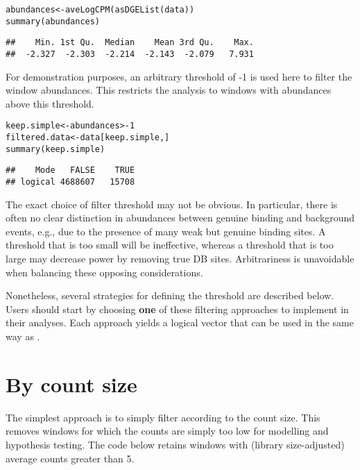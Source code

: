 \documentclass{report}\usepackage[]{graphicx}\usepackage[usenames,dvipsnames]{color}
\newcommand{\hlnum}[1]{\textcolor[rgb]{0.816,0.125,0.439}{#1}}%
\newcommand{\hlopt}[1]{\textcolor[rgb]{0,0,0}{#1}}%
\newcommand{\hlstd}[1]{\textcolor[rgb]{0.251,0.251,0.251}{#1}}%
\newcommand{\hlkwb}[1]{\textcolor[rgb]{0,0,0}{#1}}%
\newcommand{\hlkwd}[1]{\textcolor[rgb]{0.878,0.439,0.125}{#1}}%
\newenvironment{knitrout}{}{} %
\begin{document}
\begin{knitrout}
\color{fgcolor}\begin{kframe}
\begin{alltt}
\hlstd{abundances} \hlkwb{<-} \hlkwd{aveLogCPM}\hlstd{(}\hlkwd{asDGEList}\hlstd{(data))}
\hlkwd{summary}\hlstd{(abundances)}
\end{alltt}
\begin{verbatim}
##    Min. 1st Qu.  Median    Mean 3rd Qu.    Max. 
##  -2.327  -2.303  -2.214  -2.143  -2.079   7.931
\end{verbatim}
\end{kframe}
\end{knitrout}

For demonstration purposes, an arbitrary threshold of -1 is used here to filter the window abundances. 
This restricts the analysis to windows with abundances above this threshold.

\begin{knitrout}
\color{fgcolor}\begin{kframe}
\begin{alltt}
\hlstd{keep.simple} \hlkwb{<-} \hlstd{abundances} \hlopt{> -}\hlnum{1}
\hlstd{filtered.data} \hlkwb{<-} \hlstd{data[keep.simple,]}
\hlkwd{summary}\hlstd{(keep.simple)}
\end{alltt}
\begin{verbatim}
##    Mode   FALSE    TRUE 
## logical 4688607   15708
\end{verbatim}
\end{kframe}
\end{knitrout}

The exact choice of filter threshold may not be obvious.
In particular, there is often no clear distinction in abundances between genuine binding and background events, e.g., due to the presence of many weak but genuine binding sites.
A threshold that is too small will be ineffective, whereas a threshold that is too large may decrease power by removing true DB sites.
Arbitrariness is unavoidable when balancing these opposing considerations.

Nonetheless, several strategies for defining the threshold are described below.
Users should start by choosing \textbf{one} of these filtering approaches to implement in their analyses.
Each approach yields a logical vector that can be used in the same way as .

\section{By count size}
The simplest approach is to simply filter according to the count size.
This removes windows for which the counts are simply too low for modelling and hypothesis testing.
The code below retains windows with (library size-adjusted) average counts greater than 5. 
\end{document}
